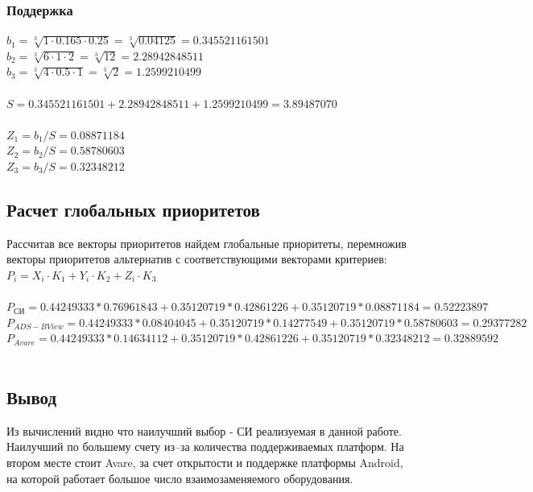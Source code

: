 \documentclass[a4paper,12pt]{report} %
\begin{document}
\subsubsection{Поддержка}
$ b_1=\sqrt[3]{1 \cdot 0.165 \cdot 0.25} = \sqrt[3]{0.04125} = 0.345521161501 $ \\
$ b_2=\sqrt[3]{6 \cdot 1 \cdot 2} = \sqrt[3]{12} = 2.28942848511 $ \\
$ b_3=\sqrt[3]{4 \cdot 0.5 \cdot 1} = \sqrt[3]{2} = 1.2599210499 $ \\
\\
$ S = 0.345521161501 + 2.28942848511 + 1.2599210499 = 3.89487070 $ \\
\\
$ Z_1 = b_1/S = 0.08871184 $ \\
$ Z_2 = b_2/S = 0.58780603 $ \\
$ Z_3 = b_3/S = 0.32348212 $ \\

\subsection{Расчет глобальных приоритетов}

Рассчитав все векторы приоритетов найдем глобальные приоритеты, перемножив
векторы приоритетов альтернатив с соответствующими векторами критериев:\\

$P_i=X_i \cdot K_1 + Y_i \cdot K_2 + Z_i \cdot K_3 $ \\
\\
$P_{СИ} = 0.44249333 * 0.76961843 + 0.35120719 * 0.42861226 + 0.35120719 *
0.08871184 = 0.52223897$ \\
$P_{ADS-B View} = 0.44249333 * 0.08404045 + 0.35120719 * 0.14277549 + 0.35120719
* 0.58780603 = 0.29377282 $ \\
$P_{Avare} = 0.44249333 * 0.14634112 + 0.35120719 * 0.42861226 + 0.35120719 *
0.32348212 = 0.32889592$ \\
\\
\subsection{Вывод}

Из вычислений видно что наилучший выбор - СИ реализуемая в данной работе.
Наилучший по большему счету из--за количества поддерживаемых платформ. На втором
месте стоит Avare, за счет открытости и поддержке платформы Android, на которой
работает большое число взаимозаменяемого оборудования.
\end{document}
